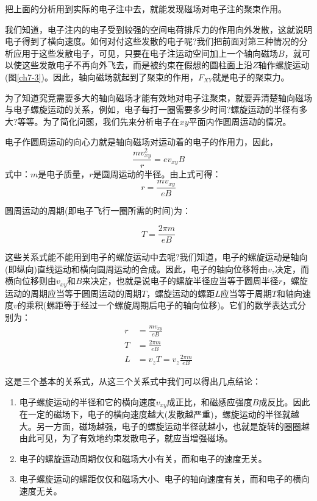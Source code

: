 把上面的分析用到实际的电子注中去，就能发现磁场对电子注的聚束作用。

我们知道，电子注内的电子受到较强的空间电荷排斥力的作用向外发散，这就说明电子得到了横向速度。如何对付这些发散的电子呢?我们把前面对第三种情况的分析应用于这些发散电子，可见，只要在电子注运动空间加上一个轴向磁场$ B $，就可以使这些发散电子不再向外飞去，而是被约束在假想的圆柱面上沿$ Z $轴作螺旋运动(图\ref{ch7-3})。因此，轴向磁场就起到了聚束的作用，$ F_{XY} $就是电子的聚束力。

为了知道究竞需要多大的轴向磁场才能有效地对电子注聚束，就要弄清楚轴向磁场与电子螺旋运动的关系，例如，电子每打一圈需要多少时间?螺旋运动的半径有多大?等等。为了简化问题，我们先来分析电子在$ xy $平面内作圆周运动的情况。

电子作圆周运动的向心力就是轴向磁场对运动着的电子的作用力，因此，
\begin{equation} \label{eq:ch7-1}
	\frac{mv_{xy}^2}{r} = ev_{xy}B
\end{equation}
式中：$ m $是电子质量，$ r $是圆周运动的半径。由上式可得：
\begin{equation} \label{eq:ch7-2}
	r = \frac{mv_{xy}}{eB}
\end{equation}

圆周运动的周期(即电子飞行一圈所需的时间)为：

\begin{equation} \label{eq:ch7-3}
	T = \frac{2\pi m}{eB}
\end{equation}

这些关系式能不能用到电子的螺旋运动中去呢?我们知道，电子的螺旋运动是轴向(即纵向)直线运动和横向圆周运动的合成。因此，电子的轴向位移将由$ v_z $决定，而横向位移则由$ v_{xy} $和$ B $来决定，也就是说电子的螺旋半径应当等于圆周半径$ r $，螺旋运动的周期应当等于圆周运动的周期$ T $，螺旋运动的螺距$ L $应当等于周期$ T $和轴向速度$ v $的乘积(螺距等于经过一个螺旋周期后电子的轴向位移)。它们的数学表达式分别为：
\begin{equation} \label{eq:ch7-4}
	\begin{aligned}
	r &= \frac{mv_{xy}}{eB}\\
	T &= \frac{2\pi m}{eB}\\
	L &= v_zT = v_z\frac{2\pi m}{eB}
	\end{aligned}
\end{equation}

这是三个基本的关系式，从这三个关系式中我们可以得出几点结论：

\begin{enumerate}
	\item 电子螺旋运动的半径和它的横向速度$ v_{xy} $成正比，和磁感应强度$ B $成反比。因此在一定的磁场下，电子的横向速度越大(发散越严重)，螺旋运动的半径就越大。另一方面，磁场越强，电子的螺旋运动半径就越小，也就是旋转的圈圈越由此可见，为了有效地约束发散电子，就应当增强磁场。
	\item 电子的螺旋运动周期仅仅和磁场大小有关，而和电子的速度无关。 \label{item:ch7-1}
	\item 电子螺旋运动的螺距仅仅和磁场大小、电子的轴向速度有关，而和电子的横向速度无关。\label{item:ch7-2}
\end{enumerate}



